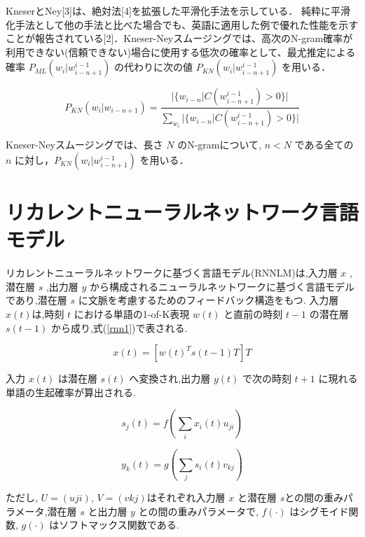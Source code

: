 
KneserとNey[3]は、絶対法[4]を拡張した平滑化手法を示している．
純粋に平滑化手法として他の手法と比べた場合でも、英語に適用した例で優れた性能を示すことが報告されている[2]．Kneser-Neyスムージングでは、高次のN-gram確率が利用できない(信頼できない)場合に使用する低次の確率として、最尤推定による確率 $P_{ML} (w_i|w_{i-n+1}^{i-1})$ の代わりに次の値 $P_{KN} (w_i|w_{i-n+1}^{i-1})$ を用いる．

\begin{equation}
		P_{KN} (w_i|w_{i-n+1}) = \frac{|\{w_{i-n}|C(w_{i-n+1}^{i-1}) > 0\}|}{\sum_{w_i} |\{w_{i-n}|C(w_{i-n+1}^{i-1}) > 0\}|} 
    \label{ngram_smoosing2}
\end{equation}

Kneser-Neyスムージングでは、長さ $N$ のN-gramについて, $n  <  N$ である全ての $n$ に対し，$P_{KN} (w_i|w_{i-n+1}^{i-1})$ を用いる．

\section{リカレントニューラルネットワーク言語モデル}
リカレントニューラルネットワークに基づく言語モデル(RNNLM)は,入力層 $x$ ,潜在層 $s$ ,出力層 $y$ から構成されるニューラルネットワークに基づく言語モデルであり,潜在層 $s$ に文脈を考慮するためのフィードバック構造をもつ. 入力層 $x(t)$は,時刻 $t$ における単語の1-of-K表現 $w(t)$ と直前の時刻 $t−1$
の潜在層 $s(t−1)$ から成り,式(\ref{rnn1})で表される.

\begin{equation}
		x(t) = [w(t)^T s(t-1)T]T
    \label{rnn1}
\end{equation}

入力 $x(t)$ は潜在層 $s(t)$ へ変換され,出力層 $y(t)$ で次の時刻 $t+1$ に現れる単語の生起確率が算出される.

\begin{equation}
		s_j(t) = f(\sum_i x_i(t) u_{ji})
    \label{rnn2}
\end{equation}

\begin{equation}
		y_k(t) = g(\sum_j s_i(t) v_{kj})
    \label{rnn3}
\end{equation}

ただし, $U=(uji)$, $V=(vkj)$はそれぞれ入力層 $x$ と潜在層 $s$との間の重みパラメータ,潜在層 $s$
と出力層 $y$ との間の重みパラメータで, $f(·)$ はシグモイド関数, $g(·)$ はソフトマックス関数である.


